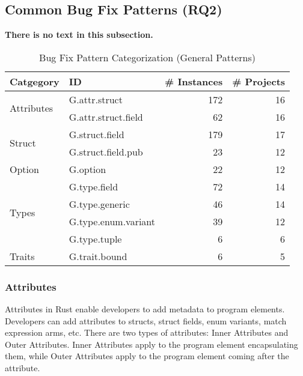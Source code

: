 
\subsection{\label{sec:common_patterns}Common Bug Fix Patterns (RQ2)}

{\bf There is no text in this subsection.} 

\begin{table}[]

\begin{tabular}{l|l|r|r}
\textbf{Catgegory} & \textbf{ID} & \textbf{\# Instances} & \textbf{\# Projects} \\
\hline
\multirow{2}{*}{Attributes} & G.attr.struct & 172 & 16                                  \\
& G.attr.struct.field & 62 & 16                     \\\cline{1-4}
\multirow{2}{*}{Struct} & G.struct.field  & 179 & 17\\
& G.struct.field.pub & 23 & 12   
\\\cline{1-4}
Option & G.option & 22 & 12                    \\\cline{1-4}
\multirow{4}{*}{Types} & G.type.field  & 72 & 14 \\
& G.type.generic & 46 & 14\\ & G.type.enum.variant  & 39 & 12 \\
& G.type.tuple & 6 & 6                                         \\\cline{1-4}
\multirow{1}{*}{Traits} & G.trait.bound & 6 & 5 \\ 
\end{tabular}
\caption{\label{table:general}Bug Fix Pattern Categorization (General Patterns)}
\end{table}
    
    

\subsubsection{Attributes}

Attributes in Rust enable developers to add metadata to program elements. Developers can add attributes to structs, struct fields, enum variants, match expression arms, etc. There are two types of attributes: Inner Attributes and Outer Attributes. Inner Attributes apply to the program element encapsulating them, while Outer Attributes apply to the program element coming after the attribute. \\

